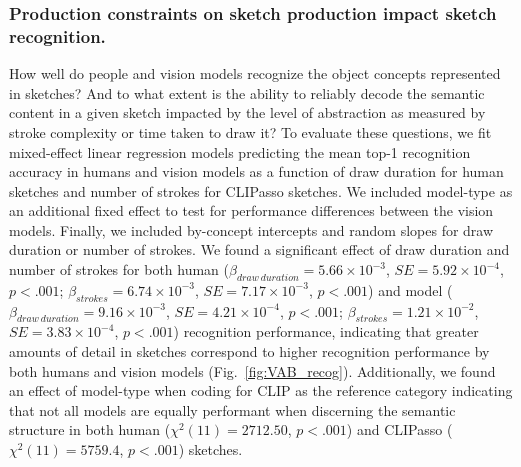 \documentclass[10pt,letterpaper]{article}
\begin{document}
\subsubsection{Production constraints on sketch production impact sketch recognition.}

How well do people and vision models recognize the object concepts represented in sketches? 
And to what extent is the ability to reliably decode the semantic content in a given sketch impacted by the level of abstraction as measured by stroke complexity or time taken to draw it?  
To evaluate these questions, we fit mixed-effect linear regression models predicting the mean top-1 recognition accuracy in humans and vision models as a function of draw duration for human sketches and number of strokes for CLIPasso sketches. 
We included model-type as an additional fixed effect to test for performance differences between the vision models. 
Finally, we included by-concept intercepts and random slopes for draw duration or number of strokes.
We found a significant effect of draw duration and number of strokes for both human ($\beta_{draw \: duration}=5.66\times10^{-3}$, $SE=5.92\times10^{-4}$, $p<.001$; $\beta_{strokes} = 6.74 \times 10^{-3}$, $SE = 7.17 \times 10^{-3}$, $p<.001$) and model ($\beta_{draw \: duration} = 9.16\times10^{-3}$, $SE= 4.21\times10^{-4}$, $p <.001$; $\beta_{strokes} = 1.21 \times 10^{-2}$, $SE = 3.83 \times 10^{-4}$, $p<.001$) recognition performance, indicating that greater amounts of detail in sketches correspond to higher recognition performance by both humans and vision models (Fig.~\ref{fig:VAB_recog}). 
Additionally, we found an effect of model-type when coding for CLIP as the reference category indicating that not all models are equally performant when discerning the semantic structure in both human ($\chi^2(11)=2712.50$, $p<.001$) and CLIPasso ($\chi^2(11) = 5759.4$, $p<.001$) sketches.
\end{document}
